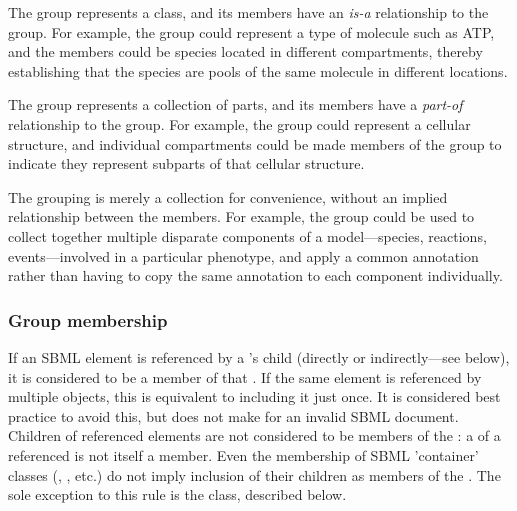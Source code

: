 \begin{description}[font=\normalfont\ttfamily\color{black},style=nextline]

\item[\token{classification}] The group represents a class, and its members have an \emph{is-a} relationship to the group.  For example, the group could represent a type of molecule such as ATP, and the members could be species located in different compartments, thereby establishing that the species are pools of the same molecule in different locations.

\item[\token{partonomy}] The group represents a collection of parts, and its members have a \emph{part-of} relationship to the group.  For example, the group could represent a cellular structure, and individual compartments could be made members of the group to indicate they represent subparts of that cellular structure.

\item[\token{collection}] The grouping is merely a collection for convenience, without an implied relationship between the members.  For example, the group could be used to collect together multiple disparate components of a model---species, reactions, events---involved in a particular phenotype, and apply a common annotation rather than having to copy the same annotation to each component individually.

\end{description}

\subsubsection{Group membership}
\label{group-membership}

If an SBML element is referenced by a \Group's child \Member (directly or indirectly---see below), it is considered to be a member of that \Group.  If the same element is referenced by multiple \Member objects, this is equivalent to including it just once.  It is considered best practice to avoid this, but does not make for an invalid SBML document.  Children of referenced elements are not considered to be members of the \Group: a \KineticLaw of a referenced \Reaction is not itself a \Group member.  Even the membership of SBML 'container' classes (\ListOfSpecies, \ListOfCompartments, etc.) do not imply inclusion of their children as members of the \Group.  The sole exception to this rule is the \ListOfMembers class, described below. 


